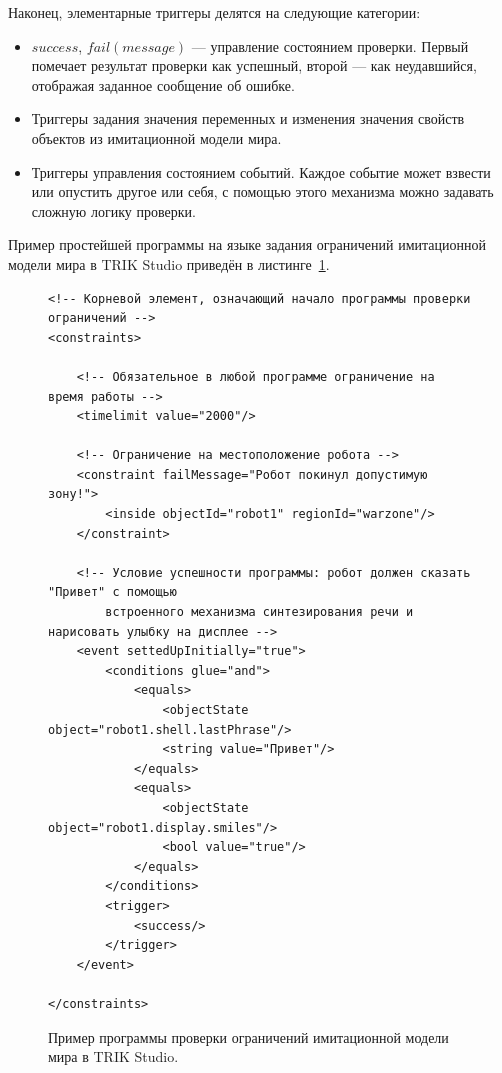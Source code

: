 \documentclass[conference]{IEEEtran}
\begin{document}
Наконец, элементарные триггеры делятся на следующие категории:
\begin{itemize}
	\item $success$, $fail(message)$ --- управление состоянием проверки. Первый помечает результат проверки 
			как успешный, второй --- как неудавшийся, отображая заданное сообщение об ошибке.
	\item Триггеры задания значения переменных и изменения значения свойств объектов из имитационной модели мира.
	\item Триггеры управления состоянием событий. Каждое событие может взвести или опустить другое или себя, 
			с помощью этого механизма можно задавать сложную логику проверки.
\end{itemize}

Пример простейшей программы на языке задания ограничений имитационной модели мира в TRIK Studio приведён в листинге~\ref{code:constraints}.

\captionsetup[figure]{name=Листинг}
\setcounter{figure}{0}

\begin{figure}[!t]
\begin{verbatim}
<!-- Корневой элемент, означающий начало программы проверки ограничений -->
<constraints>

    <!-- Обязательное в любой программе ограничение на время работы -->
    <timelimit value="2000"/>

    <!-- Ограничение на местоположение робота -->
    <constraint failMessage="Робот покинул допустимую зону!">
        <inside objectId="robot1" regionId="warzone"/>
    </constraint>

    <!-- Условие успешности программы: робот должен сказать "Привет" с помощью
        встроенного механизма синтезирования речи и нарисовать улыбку на дисплее -->
    <event settedUpInitially="true">
        <conditions glue="and">
            <equals>
                <objectState object="robot1.shell.lastPhrase"/>
                <string value="Привет"/>
            </equals>
            <equals>
                <objectState object="robot1.display.smiles"/>
                <bool value="true"/>
            </equals>
        </conditions>
        <trigger>
            <success/>
        </trigger>
    </event>

</constraints>
\end{verbatim}
\caption{Пример программы проверки ограничений имитационной модели мира в TRIK Studio.}
\label{code:constraints}
\end{figure}
\end{document}
